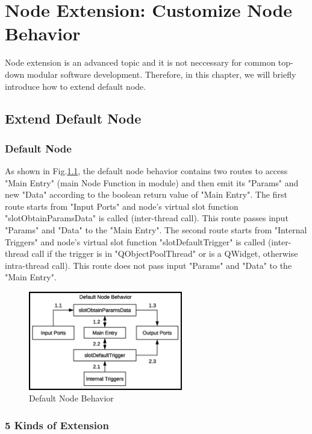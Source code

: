 \documentclass[a4paper,10pt]{book}
\begin{document}
\chapter{Node Extension: Customize Node Behavior} \label{nodeextension}

Node extension is an advanced topic and it is not neccessary for common top-down modular software development. Therefore, in this chapter, we will briefly introduce how to extend default node.

\section{Extend Default Node}

\subsection{Default Node}

As shown in Fig.\ref{fig:defaultnode}, the default node behavior contains two routes to access "Main Entry" (main Node Function in module) and then emit its "Params" and new "Data" according to the boolean return value of "Main Entry". The first route starts from "Input Ports" and node's virtual slot function "slotObtainParamsData" is called (inter-thread call). This route passes input "Params" and "Data" to the "Main Entry". The second route starts from "Internal Triggers" and node's virtual slot function "slotDefaultTrigger" is called (inter-thread call if the trigger is in "QObjectPoolThread" or is a QWidget, otherwise intra-thread call). This route does not pass input "Params" and "Data" to the "Main Entry".

\begin{figure}
\centering
\includegraphics[width=0.6\textwidth]{img/defaultnode.eps}
\caption{Default Node Behavior}
\label{fig:defaultnode}
\end{figure}

\subsection{5 Kinds of Extension}
\end{document}
